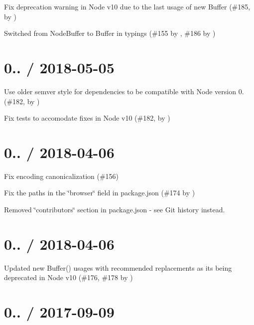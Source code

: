
\begin{DoxyItemize}
\item Fix deprecation warning in Node v10 due to the last usage of {\ttfamily new Buffer} (\#185, by )
\item Switched from Node\+Buffer to Buffer in typings (\#155 by , \#186 by )
\end{DoxyItemize}

\section*{0.. / 2018-\/05-\/05}


\begin{DoxyItemize}
\item Use older semver style for dependencies to be compatible with Node version 0. (\#182, by )
\item Fix tests to accomodate fixes in Node v10 (\#182, by )
\end{DoxyItemize}

\section*{0.. / 2018-\/04-\/06}


\begin{DoxyItemize}
\item Fix encoding canonicalization (\#156)
\item Fix the paths in the \char`\"{}browser\char`\"{} field in package.\+json (\#174 by )
\item Removed \char`\"{}contributors\char`\"{} section in package.\+json -\/ see Git history instead.
\end{DoxyItemize}

\section*{0.. / 2018-\/04-\/06}


\begin{DoxyItemize}
\item Updated {\ttfamily new Buffer()} usages with recommended replacements as it\textquotesingle{}s being deprecated in Node v10 (\#176, \#178 by )
\end{DoxyItemize}

\section*{0.. / 2017-\/09-\/09}


